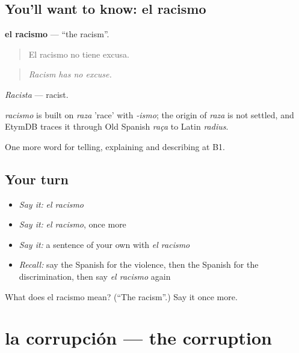 \subsection*{You'll want to know: el racismo}
\textbf{el racismo} — \textquotedblleft{}the racism\textquotedblright{}.

\begin{quote}
El racismo no tiene excusa.
\end{quote}

\begin{quote}
\emph{Racism has no excuse.}
\end{quote}

\emph{Racista} — racist.

\begin{cousinweb}
\emph{racismo} is built on \emph{raza} 'race' with \emph{-ismo}; the origin of \emph{raza} is not settled, and EtymDB traces it through Old Spanish \emph{raça} to Latin \emph{radius}.
\end{cousinweb}

\begin{grammarlens}[title={What you've built}]
One more word for telling, explaining and describing at B1.
\end{grammarlens}

\subsection*{Your turn}
\begin{itemize}
\raggedright
  \item \emph{Say it:} \emph{el racismo}
  \item \emph{Say it:} \emph{el racismo}, once more
  \item \emph{Say it:} a sentence of your own with \emph{el racismo}
  \item \emph{Recall:} say the Spanish for the violence, then the Spanish for the discrimination, then say \emph{el racismo} again
\end{itemize}

\begin{tcolorbox}[breakable,colback=teal!4,colframe=teal!35!black,title={Before you move on}]
What does el racismo mean? (\textquotedblleft{}The racism\textquotedblright{}.) Say it once more.
\end{tcolorbox}
\section[la corrupción]{la corrupción — the corruption}

